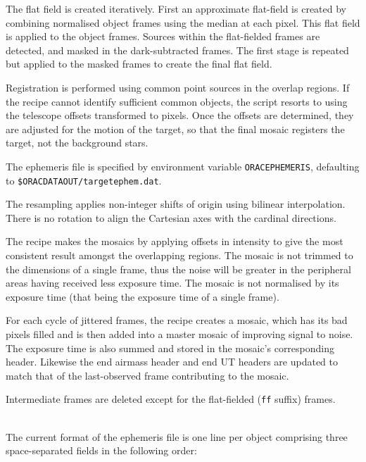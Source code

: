 \documentclass[twoside,11pt]{article}
\renewcommand{\_}{\texttt{\symbol{95}}}
\newcommand{\sstdiytopic}[2]{\goodbreak \item[{\hspace{-0.35em}#1\hspace{-0.35em}:}] \mbox{} \\[1.3ex] #2}
\newcommand{\ssthitemlist}[1]{
  \mbox{} \\
  \vspace{-3.5ex}
  \begin{itemize}
     #1
  \end{itemize}
}
\newcommand{\sstitem}{\item}
\newcommand{\sstdiytopic}[2]{\item[{#1}:]
      \begin{description}
         #2
      \end{description}
      \\
   }
\newcommand{\ssthitemlist}[1]{
      \begin{itemize}
         #1
      \end{itemize}
      \\
   }
\begin{document}
{{{         \sstitem
         The flat field is created iteratively.  First an approximate
         flat-field is created by combining normalised object frames using
         the median at each pixel.  This flat field is applied to the object
         frames.  Sources within the flat-fielded frames are detected, and
         masked in the dark-subtracted frames.  The first stage is repeated
         but applied to the masked frames to create the final flat field.

         \sstitem
         Registration is performed using common point sources in the
         overlap regions.  If the recipe cannot identify sufficient common
         objects, the script resorts to using the telescope offsets
         transformed to pixels.  Once the offsets are determined, they
         are adjusted for the motion of the target, so that the final
         mosaic registers the target, not the background stars.

         \sstitem
         The ephemeris file is specified by environment variable
         {\tt{ORAC\_EPHEMERIS}}, defaulting to {\tt\$ORAC\_DATA\_OUT/target\_ephem.dat}.

         \sstitem
         The resampling applies non-integer shifts of origin using
         bilinear interpolation.  There is no rotation to align the
         Cartesian axes with the cardinal directions.

         \sstitem
         The recipe makes the mosaics by applying offsets in intensity
         to give the most consistent result amongst the overlapping regions.
         The mosaic is not trimmed to the dimensions of a single frame, thus
         the noise will be greater in the peripheral areas having received
         less exposure time.  The mosaic is not normalised by its exposure
         time (that being the exposure time of a single frame).

         \sstitem
         For each cycle of jittered frames, the recipe creates a mosaic,
         which has its bad pixels filled and is then added into a master
         mosaic of improving signal to noise.  The exposure time is also
         summed and stored in the mosaic's corresponding header.
	 Likewise the end airmass header and end UT headers are
	 updated to match that of the last-observed frame contributing
	 to the mosaic.

         \sstitem
         Intermediate frames are deleted except for the flat-fielded ({\tt\_ff}
         suffix) frames.
      }
   }
   \label{mjsf_ephem_format}
   \sstdiytopic{
      Ephemeris-file Format
   }{
      The current format of the ephemeris file is one line per object
      comprising three space-separated fields in the following order:
      \ssthitemlist{

}}}
\end{document}
